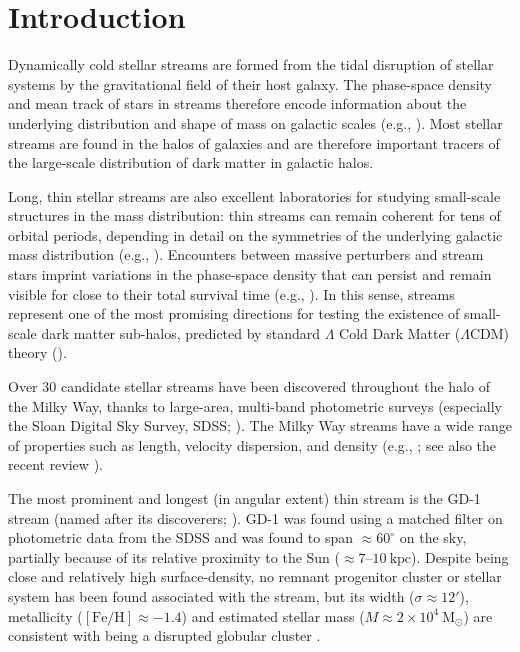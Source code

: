 \documentclass[modern]{aastex62}
\newcommand{\msun}{\textrm{M}_\odot}
\newcommand{\feh}{\ensuremath{[\textrm{Fe} / \textrm{H}]}}
\begin{document}

\section{Introduction}
\label{sec:intro}

Dynamically cold stellar streams are formed from the tidal disruption of stellar
systems by the gravitational field of their host galaxy.
The phase-space density and mean track of stars in streams therefore encode
information about the underlying distribution and shape of mass on galactic
scales (e.g., \citealt{Johnston:1999, Bonaca:2018}).
Most stellar streams are found in the halos of galaxies and are therefore
important tracers of the large-scale distribution of dark matter in galactic
halos.

Long, thin stellar streams are also excellent laboratories for studying
small-scale structures in the mass distribution:
thin streams can remain coherent for tens of orbital periods, depending in
detail on the symmetries of the underlying galactic mass distribution (e.g.,
\citealt{Erkal:2016a}).
Encounters between massive perturbers and stream stars imprint variations in the
phase-space density that can persist and remain visible for close to their total
survival time (e.g., \citealt{Yoon:2011}).
In this sense, streams represent one of the most promising directions for
testing the existence of small-scale dark matter sub-halos, predicted by
standard $\Lambda$ Cold Dark Matter ($\Lambda$CDM) theory
(\citealt{Erkal:2015, Sanders:2016, Bovy:2017}).

Over 30 candidate stellar streams have been discovered throughout the halo of
the Milky Way, thanks to large-area, multi-band photometric surveys (especially
the Sloan Digital Sky Survey, SDSS; \citealt{York:2000}).
The Milky Way streams have a wide range of properties such as length, velocity
dispersion, and density (e.g., \citealt{Odenkirchen:2001, Grillmair:2006,
Grillmair:2006b, Belokurov:2006, Belokurov:2007, Bonaca:2012, Shipp:2018}; see
also the recent review \citealt{Grillmair:2016, Newberg:2016}).

The most prominent and longest (in angular extent) thin stream is the GD-1
stream (named after its discoverers; \citealt{Grillmair:2006}).
GD-1 was found using a matched filter on photometric data from the SDSS and
was found to span $\approx 60^\circ$ on the sky, partially
because of its relative proximity to the Sun ($\approx 7$--$10~\textrm{kpc}$).
Despite being close and relatively high surface-density, no remnant progenitor
cluster or stellar system has been found associated with the stream, but its
width ($\sigma \approx 12'$),  metallicity ($\feh \approx -1.4$) and estimated
stellar mass ($M \approx 2 \times 10^4~\msun$) are
consistent with being a disrupted globular cluster \citep{Koposov:2010}.
\end{document}
